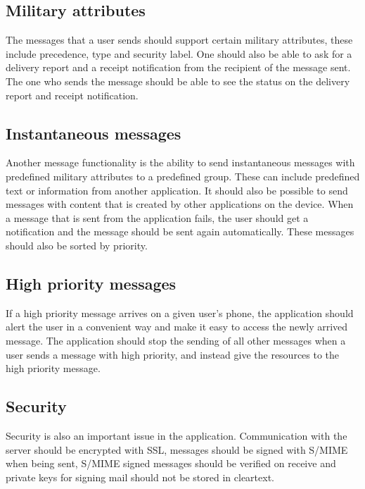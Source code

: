 \subsection{Military attributes}
The messages that a user sends should support certain military attributes, these include precedence, type and security label. 
\newline
\newline
One should also be able to ask for a delivery report and a receipt notification from the recipient of the message sent. The one who sends the message should be able to see the status on the delivery report and receipt notification.

\subsection{Instantaneous messages}
Another message functionality is the ability to send instantaneous messages with predefined military attributes to a predefined group. These can include predefined text or information from another application. It should also be possible to send messages with content that is created by other applications on the device.
\newline
\newline
When a message that is sent from the application fails, the user should get a notification and the message should be sent again automatically. These messages should also be sorted by priority.

\subsection{High priority messages}
If a high priority message arrives on a given user’s phone, the application should alert the user in a convenient way and make it easy to access the newly arrived message. The application should stop the sending of all other messages when a user sends a message with high priority, and instead give the resources to the high priority message.  

\subsection{Security}
Security is also an important issue in the application. Communication with the server should be encrypted with SSL, messages should be signed with S/MIME when being sent, S/MIME signed messages should be verified on receive and private keys for
signing mail should not be stored in cleartext.
